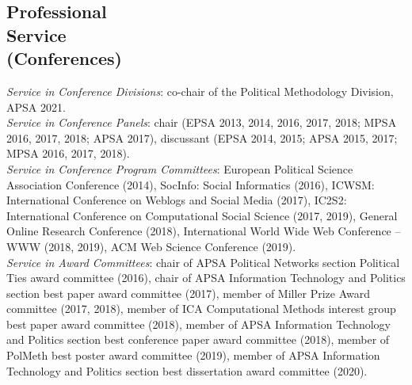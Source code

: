 \documentclass[margin,line,11pt]{resume}
\newcommand{\nl}{\vspace{0.10in}\\}
\begin{document}
\begin{resume}


\section{\mysidestyle Professional\\Service\\(Conferences)}

\emph{Service in Conference Divisions}: co-chair of the Political Methodology Division, APSA 2021.\nl
\emph{Service in Conference Panels}: chair (EPSA 2013, 2014, 2016, 2017, 2018; MPSA 2016, 2017, 2018; APSA 2017), discussant (EPSA 2014, 2015; APSA 2015, 2017; MPSA 2016, 2017, 2018).\nl
\emph{Service in Conference Program Committees}: European Political Science Association Conference (2014), SocInfo: Social Informatics (2016), ICWSM: International Conference on Weblogs and Social Media (2017), IC2S2: International Conference on Computational Social Science (2017, 2019), General Online Research Conference (2018),  International World Wide Web Conference -- WWW (2018, 2019), ACM Web Science Conference (2019).\nl
\emph{Service in Award Committees}: chair of APSA Political Networks section Political Ties award committee (2016), chair of APSA Information Technology and Politics section best paper award committee (2017), member of Miller Prize Award committee (2017, 2018), member of ICA Computational Methods interest group best paper award committee (2018), member of APSA Information Technology and Politics section best conference paper award committee (2018), member of PolMeth best poster award committee (2019), member of APSA Information Technology and Politics section best dissertation award committee (2020).


\end{resume}
\end{document}
